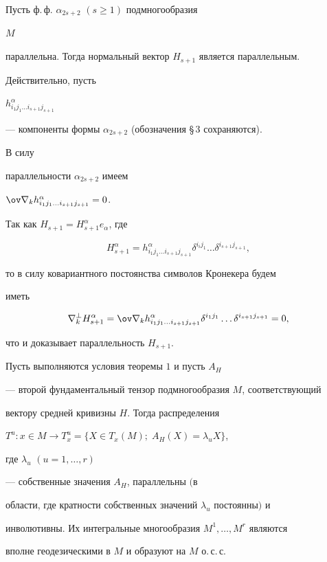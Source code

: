 \begin{lem} Пусть ф.\,ф. $\alpha_{2s+2}$ $(s\ge 1)$ подмногообразия


$M$


параллельна. Тогда нормальный вектор $H_{s+1}$ является параллельным.


\end{lem}





\begin{pf} Действительно, пусть


$h^\alpha_{i_1 j_1\dots i_{s+1}j_{s+1}}$


--- компоненты формы $\alpha_{2s+2}$ (обозначения \S\,3 сохраняются).


В силу


параллельности $\alpha_{2s+2}$ имеем


$\ov\nabla_k h^\alpha_{i_1 j_1\dots i_{s+1}j_{s+1}}=0$.


Так как $H_{s+1}=H^\alpha_{s+1}e_\alpha$, где


$$


H^\alpha_{s+1}=h^\alpha_{i_1 j_1\dots i_{s+1}j_{s+1}}


\delta^{i_i j_1}\dots


\delta^{i_{s+1}j_{s+1}},


$$


то в силу ковариантного постоянства символов Кронекера будем


иметь


$$


\nabla^\bot_k H^\alpha_{s+1}=\ov\nabla_k


h^\alpha_{i_1 j_1\dots i_{s+1}j_{s+1}}


\delta^{i_1 j_1}\dots\delta^{i_{s+1}j_{s+1}}=0,


$$


что и доказывает параллельность $H_{s+1}$.


\end{pf}





\begin{lem} Пусть выполняются условия теоремы $1$ и пусть $A_H$


--- второй фундаментальный тензор подмногообразия $M$, соответствующий


вектору средней кривизны $H$. Тогда распределения


$T^u:x\in M\to T^u_x=\{X\in T_x(M);\;A_H(X)=\lambda_u X\}$,


где $\lambda_u$ $(u=1,\dotsc,r)$


--- собственные значения $A_H$, параллельны $($в


области, где кратности собственных значений $\lambda_u$ постоянны$)$ и


инволютивны. Их интегральные многообразия $M^1,\dotsc,M^r$ являются


вполне геодезическими в $M$ и образуют на $M$ о.\,с.\,с.


\end{lem}





